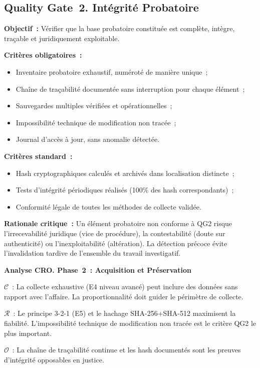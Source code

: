 \subsection{Quality Gate~2. Intégrité Probatoire}

\textbf{Objectif~:} Vérifier que la base probatoire constituée est complète,
intègre, traçable et juridiquement exploitable.

\textbf{Critères obligatoires~:}
\begin{itemize}
    \item Inventaire probatoire exhaustif, numéroté de manière unique~;
    \item Chaîne de traçabilité documentée sans interruption pour chaque élément~;
    \item Sauvegardes multiples vérifiées et opérationnelles~;
    \item Impossibilité technique de modification non tracée~;
    \item Journal d'accès à jour, sans anomalie détectée.
\end{itemize}

\textbf{Critères standard~:}
\begin{itemize}
    \item Hash cryptographiques calculés et archivés dans localisation distincte~;
    \item Tests d'intégrité périodiques réalisés (100\% des hash correspondants)~;
    \item Conformité légale de toutes les méthodes de collecte validée.
\end{itemize}

\textbf{Rationale critique~:} Un élément probatoire non conforme à QG2 risque
l'irrecevabilité juridique (vice de procédure), la contestabilité (doute sur
authenticité) ou l'inexploitabilité (altération). La détection précoce évite
l'invalidation tardive de l'ensemble du travail investigatif.

\begin{boxCRO}
\textbf{Analyse CRO. Phase~2~: Acquisition et Préservation}

$\mathcal{C}$~: La collecte exhaustive (E4 niveau avancé) peut inclure des
données sans rapport avec l'affaire. La proportionnalité doit guider le
périmètre de collecte.

$\mathcal{R}$~: Le principe 3-2-1 (E5) et le hachage SHA-256+SHA-512 maximisent
la fiabilité. L'impossibilité technique de modification non tracée est le
critère QG2 le plus important.

$\mathcal{O}$~: La chaîne de traçabilité continue et les hash documentés sont
les preuves d'intégrité opposables en justice.

\end{boxCRO}

